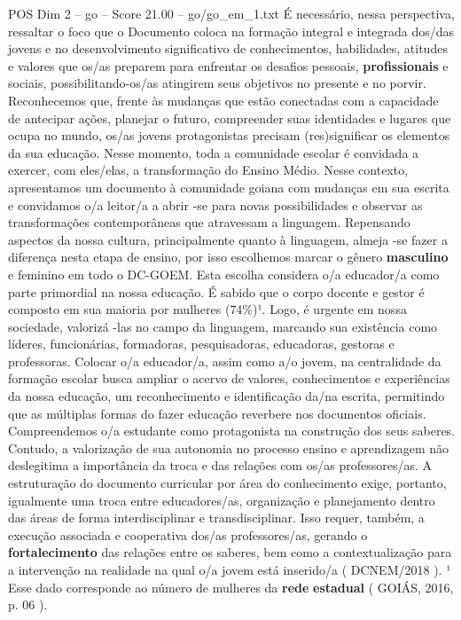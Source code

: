 \begin{textsample}{POS Dim 2 – go – Score 21.00 – go/go\_em\_1.txt}
É necessário, nessa perspectiva, ressaltar o foco que o Documento coloca na formação integral e integrada dos/das jovens e no desenvolvimento significativo de conhecimentos, habilidades, atitudes e valores que os/as preparem para enfrentar os desafios pessoais, \textbf{profissionais} e sociais, possibilitando-os/as atingirem seus objetivos no presente e no porvir.
Reconhecemos que, frente às mudanças que estão conectadas com a capacidade de antecipar ações, planejar o futuro, compreender suas identidades e lugares que ocupa no mundo, os/as jovens protagonistas precisam (res)significar os elementos da sua educação.
Nesse momento, toda a comunidade escolar é convidada a exercer, com eles/elas, a transformação do Ensino Médio.
Nesse contexto, apresentamos um documento à comunidade goiana com mudanças em sua escrita e convidamos o/a leitor/a a abrir -se para novas possibilidades e observar as transformações contemporâneas que atravessam a linguagem.
Repensando aspectos da nossa cultura, principalmente quanto à linguagem, almeja -se fazer a diferença nesta etapa de ensino, por isso escolhemos marcar o gênero \textbf{masculino} e feminino em todo o DC-GOEM.
Esta escolha considera o/a educador/a como parte primordial na nossa educação.
É sabido que o corpo docente e gestor é composto em sua maioria por mulheres (74\%)¹.
Logo, é urgente em nossa sociedade, valorizá -las no campo da linguagem, marcando sua existência como líderes, funcionárias, formadoras, pesquisadoras, educadoras, gestoras e professoras.
Colocar o/a educador/a, assim como a/o jovem, na centralidade da formação escolar busca ampliar o acervo de valores, conhecimentos e experiências da nossa educação, um reconhecimento e identificação da/na escrita, permitindo que as múltiplas formas do fazer educação reverbere nos documentos oficiais.
Compreendemos o/a estudante como protagonista na construção dos seus saberes.
Contudo, a valorização de sua autonomia no processo ensino e aprendizagem não deslegitima a importância da troca e das relações com os/as professores/as.
A estruturação do documento curricular por área do conhecimento exige, portanto, igualmente uma troca entre educadores/as, organização e planejamento dentro das áreas de forma interdisciplinar e transdisciplinar.
Isso requer, também, a execução associada e cooperativa dos/as professores/as, gerando o \textbf{fortalecimento} das relações entre os saberes, bem como a contextualização para a intervenção na realidade na qual o/a jovem está inserido/a ( DCNEM/2018 ). ¹ Esse dado corresponde ao número de mulheres da \textbf{rede} \textbf{estadual} ( GOIÁS, 2016, p. 06 ).

\end{textsample}
